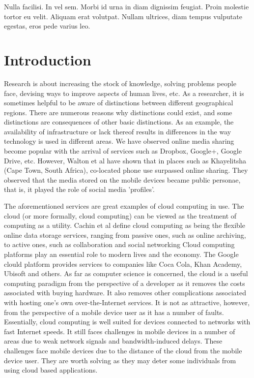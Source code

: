 \begin{savequote}[75mm] 
Nulla facilisi. In vel sem. Morbi id urna in diam dignissim feugiat. Proin molestie tortor eu velit. Aliquam erat volutpat. Nullam ultrices, diam tempus vulputate egestas, eros pede varius leo.
\end{savequote}

\chapter{Introduction}
Research is about increasing the stock of knowledge, solving problems people face, devising ways to improve aspects of human lives, etc. As a researcher, it is sometimes helpful to be aware of distinctions
between different geographical regions. There are numerous reasons why distinctions could exist, and some distinctions are consequences of other basic distinctions. As
an example, the availability of
infrastructure or lack thereof results in differences in the way technology is used in different areas. We have observed online media sharing become
popular with the arrival of services such as Dropbox, Google+, Google Drive, etc. However, Walton et al\cite{RefWorks:26} have shown that in places such as
Khayelitsha (Cape Town, South Africa), co-located phone use surpassed online sharing. They observed that the media stored on the mobile devices became public personae, that is, it played the role of social media 'profiles'\cite[p. 403]{RefWorks:26}.\newline

The aforementioned services are great examples of cloud computing in use. The cloud (or more formally, cloud computing) can be viewed as the treatment of computing as a utility. Cachin et al\cite{cachin2009trusting} define cloud computing as being the flexible online data storage services, ranging from passive ones, such as online archiving, to active ones, such as collaboration and social networking \cite[p. 81]{cachin2009trusting}
Cloud computing platforms play an essential role to modern lives and the economy. The Google clould platform provides services to companies like Coca Cola, Khan Academy, Ubisoft and others. As far as computer science is concerned, the cloud is a useful computing paradigm from the perspective of a developer
as it removes the costs associated with buying hardware. It also removes other complications associated with hosting one's own over-the-Internet services. It is not as attractive, however, from the perspective of a mobile device user as it has a number of faults. Essentially, cloud computing is well suited for devices connected to networks with fast Internet speeds. It still faces challenges in mobile devices in a number of areas due to weak
network signals and bandwidth-induced delays. These challenges face mobile devices due to the distance of the cloud from the mobile device user. They are worth solving as they may deter some individuals from using cloud based applications.\newline


